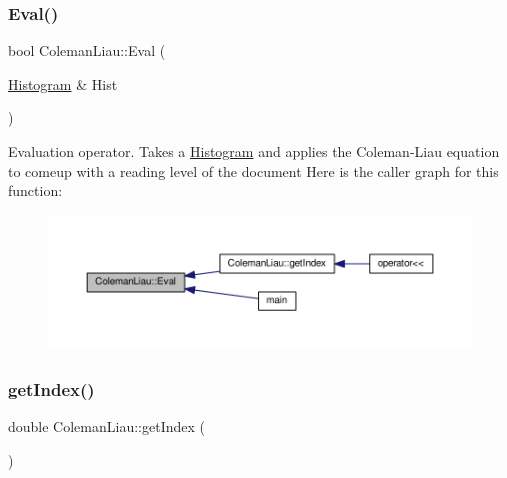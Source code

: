 \subsubsection{\texorpdfstring{Eval()}{Eval()}}
{\footnotesize\ttfamily bool Coleman\+Liau\+::\+Eval (\begin{DoxyParamCaption}\item[{\hyperlink{class_histogram}{Histogram} \&}]{Hist }\end{DoxyParamCaption})}

Evaluation operator. Takes a \hyperlink{class_histogram}{Histogram} and applies the Coleman-\/\+Liau equation to comeup with a reading level of the document Here is the caller graph for this function\+:
\nopagebreak
\begin{figure}[H]
\begin{center}
\leavevmode
\includegraphics[width=350pt]{class_coleman_liau_af0b2de26e53db82cb3e7243de1f26a6f_icgraph}
\end{center}
\end{figure}
\mbox{\label{class_coleman_liau_a3a9e5cb64586313a753211c350147cb3}} 
\subsubsection{\texorpdfstring{get\+Index()}{getIndex()}}
{\footnotesize\ttfamily double Coleman\+Liau\+::get\+Index (\begin{DoxyParamCaption}{ }\end{DoxyParamCaption})\hspace{0.3cm}{\ttfamily [inline]}}

